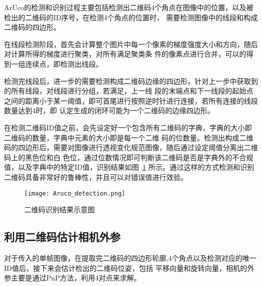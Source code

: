 ArUco的检测和识别过程主要包括检测出二维码4个角点在图像中的位置，以及被检出的二维码的ID序号，在检测4个角点的位置时，
需要检测图像中的线段和构成二维码的四边形。

在线段检测阶段，首先会计算整个图片中每一个像素的梯度强度大小和方向，随后对计算所得的梯度进行聚类，对所有满足聚类条
件的像素点进行合并，可以的得到一组连续点，即检测出线段。

检测完线段后，进一步的需要检测构成二维码边缘的四边形，针对上一步中获取到的所有线段，对线段进行分组，若满足，上一线
段的末端点和下一线段的起始点之间的距离小于某一阈值，即可首尾进行按照逆时针进行连接，若所有连接的线段数量达到4时，即
认定生成的闭环可能为一个二维码的边缘四边形。

在检测二维码ID值之前，会先设定好一个包含所有二维码的字典，字典的大小即二维码的数量，字典中元素的大小即是每一个二维
码的位数量。检测出构成二维码的四边形后，需要对图像进行透视变化规范图像，随后通过设定阈值分离出二维码上的黑色位和白
色位，通过位数情况即可判断该二维码是否是字典外的不合规值，以及字典中的特定ID值，识别结果如图~\ref{fig:Aruco_detection}
所示。通过这样的方式检测和识别二维码具备非常好的鲁棒性，并且可以对错误值进行效验。
\begin{figure}[H] %
  \centering
  \texttt{[image: Aruco\_detection.png]}
  \caption{二维码识别结果示意图}
  \label{fig:Aruco_detection}
\end{figure}

\subsection{利用二维码估计相机外参}
\label{sec:2.2.3}
对于传入的单帧图像，在提取完二维码的四边形轮廓,4个角点以及检测对应的唯一ID值后，接下来会估计检出的二维码位姿，包括
平移向量和旋转向量，相机的外参主要是通过PnP方法，利用4对点来求解。

